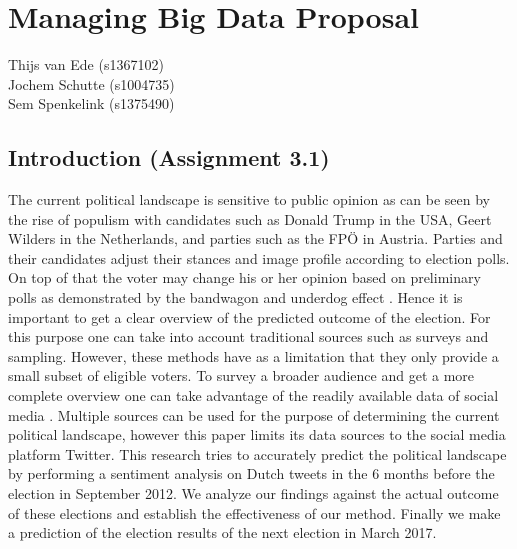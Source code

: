 \documentclass[a4paper]{report}
\begin{document}
\chapter*{Managing Big Data Proposal}
Thijs van Ede (s1367102) \\
Jochem Schutte (s1004735) \\
Sem Spenkelink (s1375490)
\section*{Introduction (Assignment 3.1)}
The current political landscape is sensitive to public opinion as can be seen by the rise of populism with candidates such as Donald Trump in the USA, Geert Wilders in the Netherlands, and parties such as the FPÖ in Austria. Parties and their candidates adjust their stances and image profile according to election polls. On top of that the voter may change his or her opinion based on preliminary polls as demonstrated by the bandwagon and underdog effect \cite{simon1954bandwagon}. Hence it is important to get a clear overview of the predicted outcome of the election. For this purpose one can take into account traditional sources such as surveys and sampling. However, these methods have as a limitation that they only provide a small subset of eligible voters. To survey a broader audience and get a more complete overview one can take advantage of the readily available data of social media \cite{cukier2013rise}. Multiple sources can be used for the purpose of determining the current political landscape, however this paper limits its data sources to the social media platform Twitter. This research tries to accurately predict the political landscape by performing a sentiment analysis on Dutch tweets in the 6 months before the election in September 2012. We analyze our findings against the actual outcome of these elections and establish the effectiveness of our method. Finally we make a prediction of the election results of the next election in March 2017.
\end{document}
